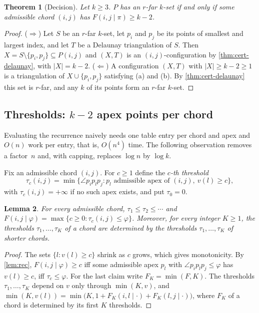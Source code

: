 \documentclass[11pt,a4paper]{article}
\newtheorem{theorem}{Theorem}
\newtheorem{lemma}[theorem]{Lemma}
\theoremstyle{definition}
\theoremstyle{remark}
\newcommand{\ang}{\angle}
\begin{document}
\begin{theorem}[Decision]\label{thm:decision}
Let $k\ge3$. $P$ has an $r$-far $k$-set if and only if some admissible chord
$(i,j)$ has $F(i,j\mid\pi)\ge k-2$.
\end{theorem}
\begin{proof}
($\Rightarrow$) Let $S$ be an $r$-far $k$-set, let $p_i$ and $p_j$ be its
points of smallest and largest index, and let $T$ be a Delaunay triangulation
of $S$. Then $X=S\setminus\{p_i,p_j\}\subseteq P(i,j)$ and $(X,T)$ is an
$(i,j)$-configuration by \cref{thm:cert-delaunay}, with $|X|=k-2$.
($\Leftarrow$) A configuration $(X,T)$ with $|X|\ge k-2\ge 1$ is a
triangulation of $X\cup\{p_i,p_j\}$ satisfying (a) and (b). By
\cref{thm:cert-delaunay} this set is $r$-far, and any $k$ of its points form
an $r$-far $k$-set.
\end{proof}

\subsection{Thresholds: \texorpdfstring{$k-2$}{k-2} apex points per chord}

Evaluating the recurrence naively needs one table entry per chord and apex and
$O(n)$ work per entry, that is, $O(n^4)$ time. The following observation
removes a factor~$n$ and, with capping, replaces $\log n$ by $\log k$.

Fix an admissible chord $(i,j)$. For $c\ge1$ define the \emph{$c$-th
threshold}
\[
\tau_c(i,j)=\min\bigl\{\ang p_ip_lp_j : p_l\text{ admissible apex of }(i,j),\ v(l)\ge c\bigr\},
\]
with $\tau_c(i,j)=+\infty$ if no such apex exists, and put $\tau_0=0$.

\begin{lemma}\label{lem:thresholds}
For every admissible chord, $\tau_1\le\tau_2\le\cdots$ and
$F(i,j\mid\varphi)=\max\{c\ge0:\tau_c(i,j)\le\varphi\}$. Moreover, for every
integer $K\ge1$, the thresholds $\tau_1,\dots,\tau_K$ of a chord are determined
by the thresholds $\tau_1,\dots,\tau_K$ of shorter chords.
\end{lemma}
\begin{proof}
The sets $\{l:v(l)\ge c\}$ shrink as $c$ grows, which gives monotonicity. By
\cref{lem:rec}, $F(i,j\mid\varphi)\ge c$ iff some admissible apex $p_l$ with
$\ang p_ip_lp_j\le\varphi$ has $v(l)\ge c$, iff $\tau_c\le\varphi$. For the
last claim write $F_K=\min(F,K)$. The thresholds $\tau_1,\dots,\tau_K$ depend
on $v$ only through $\min(K,v)$, and
$\min(K,v(l))=\min\bigl(K,1+F_K(i,l\mid\cdot)+F_K(l,j\mid\cdot)\bigr)$, where
$F_K$ of a chord is determined by its first $K$ thresholds.
\end{proof}
\end{document}
